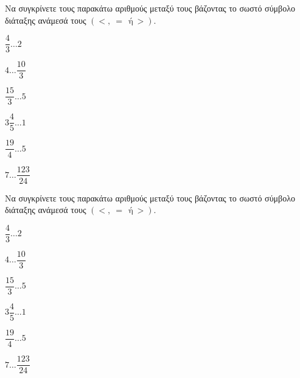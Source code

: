 Να συγκρίνετε τους παρακάτω αριθμούς μεταξύ τους βάζοντας το σωστό σύμβολο διάταξης ανάμεσά τους $ (<,\ =\ \ \textrm{ή}\ >) $.
\begin{multicols}{3}
\begin{rlist}[leftmargin=3mm]
\item $ \dfrac{4}{3}\ldots 2 $
\item $ 4\ldots \dfrac{10}{3} $
\item $ \dfrac{15}{3}\ldots 5 $
\item $ 3\dfrac{4}{5}\ldots 1 $
\item $ \dfrac{19}{4}\ldots 5 $
\item $ 7\ldots \dfrac{123}{24} $
\end{rlist}
\end{multicols}
Να συγκρίνετε τους παρακάτω αριθμούς μεταξύ τους βάζοντας το σωστό σύμβολο διάταξης ανάμεσά τους $ (<,\ =\ \ \textrm{ή}\ >) $.
\begin{multicols}{3}
\begin{rlist}[leftmargin=3mm]
\item $ \dfrac{4}{3}\ldots 2 $
\item $ 4\ldots \dfrac{10}{3} $
\item $ \dfrac{15}{3}\ldots 5 $
\item $ 3\dfrac{4}{5}\ldots 1 $
\item $ \dfrac{19}{4}\ldots 5 $
\item $ 7\ldots \dfrac{123}{24} $
\end{rlist}
\end{multicols}
